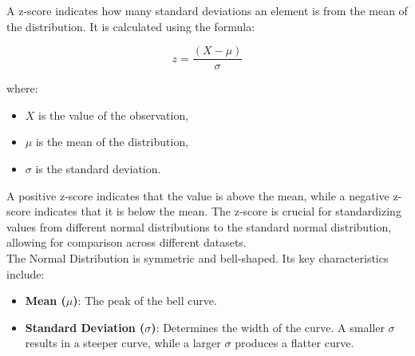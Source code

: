 \begin{definition}
    A z-score indicates how many standard deviations an element is from the mean of the distribution. It is calculated using the formula:

\[
z = \frac{(X - \mu)}{\sigma}
\]

where:
\begin{itemize}
    \item \(X\) is the value of the observation,
    \item \(\mu\) is the mean of the distribution,
    \item \(\sigma\) is the standard deviation.
\end{itemize}
\end{definition}

A positive z-score indicates that the value is above the mean, while a negative z-score indicates that it is below the mean. The z-score is crucial for standardizing values from different normal distributions to the standard normal distribution, allowing for comparison across different datasets.\\

The Normal Distribution is symmetric and bell-shaped. Its key characteristics include:
\begin{itemize}
    \item \textbf{Mean ($\mu$)}: The peak of the bell curve.
    \item \textbf{Standard Deviation ($\sigma$)}: Determines the width of the curve. A smaller $\sigma$ results in a steeper curve, while a larger $\sigma$ produces a flatter curve.
\end{itemize}

\begin{center}
    \end{center}

